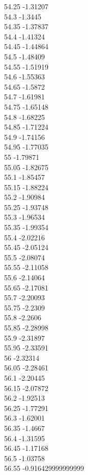 {54.25	-1.31207\\
54.3	-1.3445\\
54.35	-1.37837\\
54.4	-1.41324\\
54.45	-1.44864\\
54.5	-1.48409\\
54.55	-1.51919\\
54.6	-1.55363\\
54.65	-1.5872\\
54.7	-1.61981\\
54.75	-1.65148\\
54.8	-1.68225\\
54.85	-1.71224\\
54.9	-1.74156\\
54.95	-1.77035\\
55	-1.79871\\
55.05	-1.82675\\
55.1	-1.85457\\
55.15	-1.88224\\
55.2	-1.90984\\
55.25	-1.93748\\
55.3	-1.96534\\
55.35	-1.99354\\
55.4	-2.02216\\
55.45	-2.05124\\
55.5	-2.08074\\
55.55	-2.11058\\
55.6	-2.14064\\
55.65	-2.17081\\
55.7	-2.20093\\
55.75	-2.2309\\
55.8	-2.2606\\
55.85	-2.28998\\
55.9	-2.31897\\
55.95	-2.33591\\
56	-2.32314\\
56.05	-2.28461\\
56.1	-2.20445\\
56.15	-2.07872\\
56.2	-1.92513\\
56.25	-1.77291\\
56.3	-1.62001\\
56.35	-1.4667\\
56.4	-1.31595\\
56.45	-1.17168\\
56.5	-1.03758\\
56.55	-0.916429999999999\\
}
